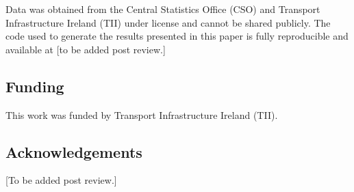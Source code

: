 \documentclass[
  super,
  preprint,
  3p]{elsarticle}
\begin{document}
Data was obtained from the Central Statistics Office (CSO) and Transport
Infrastructure Ireland (TII) under license and cannot be shared
publicly. The code used to generate the results presented in this paper
is fully reproducible and available at {[}to be added post review.{]}

\subsection*{Funding}\label{funding}

This work was funded by Transport Infrastructure Ireland (TII).

\subsection*{Acknowledgements}\label{acknowledgements}

{[}To be added post review.{]}


  
\end{document}
